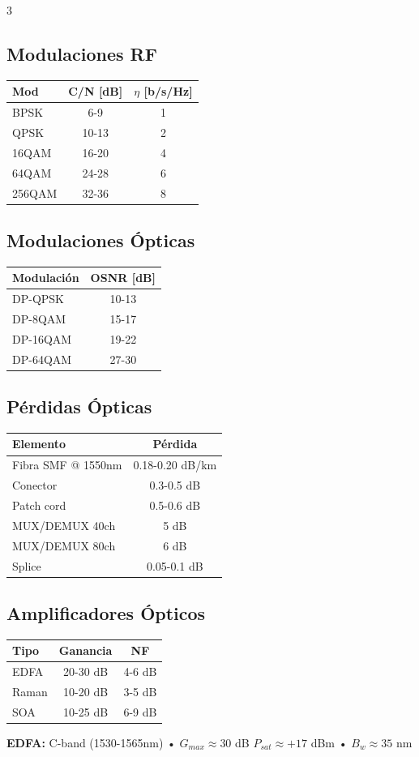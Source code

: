 \documentclass[a4paper,6pt]{extarticle}
\begin{document}
\begin{multicols}{3}
    \subsection*{Modulaciones RF}
    \begin{tabular}{|l|c|c|}
    \hline
    \textbf{Mod} & \textbf{C/N [dB]} & \textbf{$\eta$ [b/s/Hz]} \\
    \hline
    BPSK & 6-9 & 1 \\
    QPSK & 10-13 & 2 \\
    16QAM & 16-20 & 4 \\
    64QAM & 24-28 & 6 \\
    256QAM & 32-36 & 8 \\
    \hline
    \end{tabular}

    \subsection*{Modulaciones Ópticas}
    \begin{tabular}{|l|c|}
    \hline
    \textbf{Modulación} & \textbf{OSNR [dB]} \\
    \hline
    DP-QPSK & 10-13 \\
    DP-8QAM & 15-17 \\
    DP-16QAM & 19-22 \\
    DP-64QAM & 27-30 \\
    \hline
    \end{tabular}

    \subsection*{Pérdidas Ópticas}
    \begin{tabular}{|l|c|}
    \hline
    \textbf{Elemento} & \textbf{Pérdida} \\
    \hline
    Fibra SMF @ 1550nm & 0.18-0.20 dB/km \\
    Conector & 0.3-0.5 dB \\
    Patch cord & 0.5-0.6 dB \\
    MUX/DEMUX 40ch & 5 dB \\
    MUX/DEMUX 80ch & 6 dB \\
    Splice & 0.05-0.1 dB \\
    \hline
    \end{tabular}

    \subsection*{Amplificadores Ópticos}
    \begin{tabular}{|l|c|c|}
    \hline
    \textbf{Tipo} & \textbf{Ganancia} & \textbf{NF} \\
    \hline
    EDFA & 20-30 dB & 4-6 dB \\
    Raman & 10-20 dB & 3-5 dB \\
    SOA & 10-25 dB & 6-9 dB \\
    \hline
    \end{tabular}
    \textbf{EDFA:} C-band (1530-1565nm) • $G_{max} \approx 30$ dB
    $P_{sat} \approx +17$ dBm • $B_w \approx 35$ nm


\end{multicols}
\end{document}
